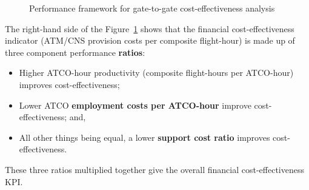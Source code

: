 \documentclass[
  11pt,
  a4paperpaper,
  openany,headsepline=on,footsepline=off,DIV=12,table]{scrbook}
\begin{document}
\begin{figure}


\caption{\label{fig-framework-g2g}Performance framework for gate-to-gate
cost-effectiveness analysis}

\end{figure}%

The right-hand side of the Figure~\ref{fig-framework-g2g} shows that the
financial cost-effectiveness indicator (ATM/CNS provision costs per
composite flight-hour) is made up of three component performance
\textbf{ratios}:

\begin{itemize}
\item
  Higher ATCO-hour productivity (composite flight-hours per ATCO-hour)
  improves cost-effectiveness;
\item
  Lower ATCO \textbf{employment costs per ATCO-hour} improve
  cost-effectiveness; and,
\item
  All other things being equal, a lower \textbf{support cost ratio}
  improves cost-effectiveness.
\end{itemize}

These three ratios multiplied together give the overall financial
cost-effectiveness KPI.
\end{document}
